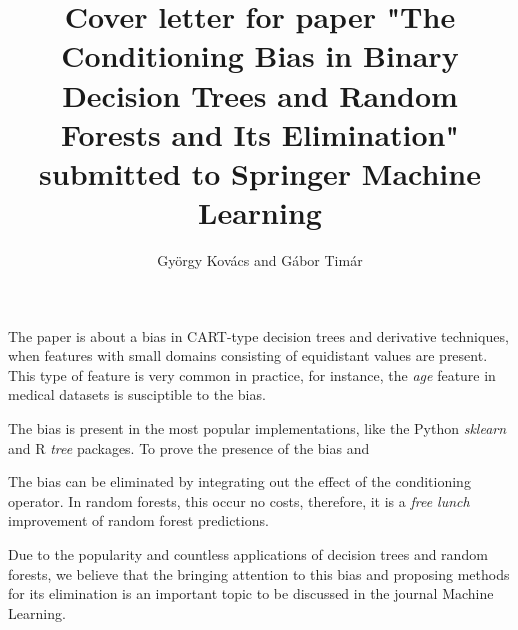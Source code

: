 \documentclass{article}
\title{Cover letter for paper "The Conditioning Bias in Binary Decision Trees and Random Forests and Its Elimination" submitted to Springer Machine Learning}
\author{Gy\"orgy Kov\'acs and G\'abor Tim\'ar}
\begin{document}
\maketitle
The paper is about a bias in CART-type decision trees and derivative techniques, when features with small domains consisting of equidistant values are present. This type of feature is very common in practice, for instance, the \emph{age} feature in medical datasets is susciptible to the bias.

The bias is present in the most popular implementations, like the Python \emph{sklearn} and R \emph{tree} packages. To prove the presence of the bias and 

The bias can be eliminated by integrating out the effect of the conditioning operator. In random forests, this occur no costs, therefore, it is a \emph{free lunch} improvement of random forest predictions.

Due to the popularity and countless applications of decision trees and random forests, we believe that the bringing attention to this bias and proposing methods for its elimination is an important topic to be discussed in the journal Machine Learning.
\end{document}
